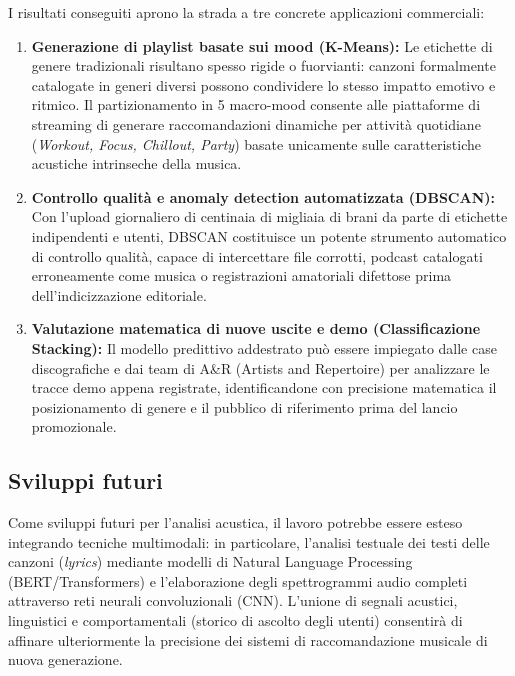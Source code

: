 I risultati conseguiti aprono la strada a tre concrete applicazioni commerciali:
\begin{enumerate}
    \item \textbf{Generazione di playlist basate sui mood (K-Means):} Le etichette di genere tradizionali risultano spesso rigide o fuorvianti: canzoni formalmente catalogate in generi diversi possono condividere lo stesso impatto emotivo e ritmico. Il partizionamento in 5 macro-mood consente alle piattaforme di streaming di generare raccomandazioni dinamiche per attività quotidiane (\textit{Workout, Focus, Chillout, Party}) basate unicamente sulle caratteristiche acustiche intrinseche della musica.
    \item \textbf{Controllo qualità e anomaly detection automatizzata (DBSCAN):} Con l'upload giornaliero di centinaia di migliaia di brani da parte di etichette indipendenti e utenti, DBSCAN costituisce un potente strumento automatico di controllo qualità, capace di intercettare file corrotti, podcast catalogati erroneamente come musica o registrazioni amatoriali difettose prima dell'indicizzazione editoriale.
    \item \textbf{Valutazione matematica di nuove uscite e demo (Classificazione Stacking):} Il modello predittivo addestrato può essere impiegato dalle case discografiche e dai team di A\&R (Artists and Repertoire) per analizzare le tracce demo appena registrate, identificandone con precisione matematica il posizionamento di genere e il pubblico di riferimento prima del lancio promozionale.
\end{enumerate}

\subsection{Sviluppi futuri}

Come sviluppi futuri per l'analisi acustica, il lavoro potrebbe essere esteso integrando tecniche multimodali: in particolare, l'analisi testuale dei testi delle canzoni (\textit{lyrics}) mediante modelli di Natural Language Processing (BERT/Transformers) e l'elaborazione degli spettrogrammi audio completi attraverso reti neurali convoluzionali (CNN). L'unione di segnali acustici, linguistici e comportamentali (storico di ascolto degli utenti) consentirà di affinare ulteriormente la precisione dei sistemi di raccomandazione musicale di nuova generazione.

